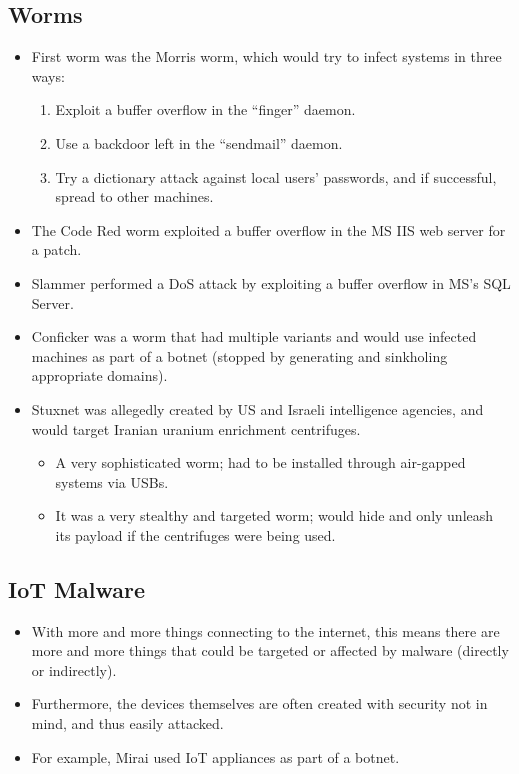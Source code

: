\documentclass{article}
\begin{document}
\subsection{Worms}
\begin{itemize}
    \item First worm was the Morris worm, which would try to infect systems in three ways:
        \begin{enumerate}
            \item Exploit a buffer overflow in the ``finger'' daemon.
            \item Use a backdoor left in the ``sendmail'' daemon.
            \item Try a dictionary attack against local users' passwords, and if successful, spread to other machines. 
        \end{enumerate}
    \item The Code Red worm exploited a buffer overflow in the MS IIS web server for a patch.
    \item Slammer performed a DoS attack by exploiting a buffer overflow in MS's SQL Server.
    \item Conficker was a worm that had multiple variants and would use infected machines as part of a botnet (stopped by generating and sinkholing appropriate domains).
    \item Stuxnet was allegedly created by US and Israeli intelligence agencies, and would target Iranian uranium enrichment centrifuges.
        \begin{itemize}
            \item A very sophisticated worm; had to be installed through air-gapped systems via USBs.
            \item It was a very stealthy and targeted worm; would hide and only unleash its payload if the centrifuges were being used.
        \end{itemize}
\end{itemize}

\subsection{IoT Malware}
\begin{itemize}
    \item With more and more things connecting to the internet, this means there are more and more things that could be targeted or affected by malware (directly or indirectly).
    \item Furthermore, the devices themselves are often created with security not in mind, and thus easily attacked.
    \item For example, Mirai used IoT appliances as part of a botnet.
\end{itemize}
\end{document}
